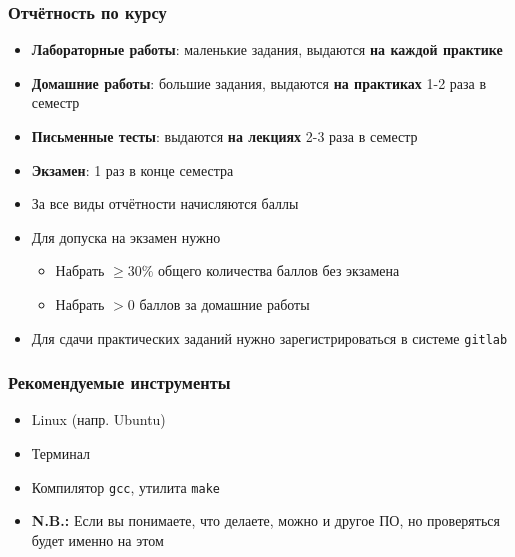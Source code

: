 \documentclass[10pt]{beamer}
\begin{document}
\begin{frame}[fragile]
\frametitle{Отчётность по курсу}
\begin{itemize}
\item \textbf{Лабораторные работы}: маленькие задания, выдаются \textbf{на каждой практике}
\item \textbf{Домашние работы}: большие задания, выдаются \textbf{на практиках} 1-2 раза в семестр
\item \textbf{Письменные тесты}: выдаются \textbf{на лекциях} 2-3 раза в семестр
\item \textbf{Экзамен}: 1 раз в конце семестра
\item За все виды отчётности начисляются баллы
\item Для допуска на экзамен нужно
\begin{itemize}
\item Набрать \(\geq30\%\) общего количества баллов без экзамена
\item Набрать \(>0\) баллов за домашние работы
\end{itemize}
\item Для сдачи практических заданий нужно зарегистрироваться в системе \nolinkurl{gitlab}
\end{itemize}
\end{frame}

\begin{frame}[fragile]
\frametitle{Рекомендуемые инструменты}
\begin{itemize}
\item Linux (напр. Ubuntu)
\pause
\item Терминал
\pause
\item Компилятор \nolinkurl{gcc}, утилита \nolinkurl{make}
\pause
\item \textbf{N.B.:} Если вы понимаете, что делаете, можно и другое ПО, но проверяться будет именно на этом
\end{itemize}
\end{frame}
\end{document}
